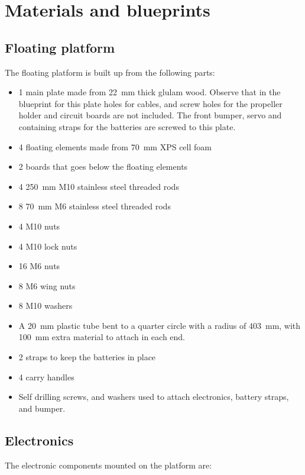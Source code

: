 \section{Materials and blueprints}

\subsection{Floating platform}

The floating platform is built up from the following parts:

\begin{itemize}
  \item 1 main plate made from 22~mm thick glulam wood. Observe that in the
    blueprint for this plate holes for cables, and screw holes for the
    propeller holder and circuit boards are not included. The front bumper,
    servo and containing straps for the batteries are screwed to this plate.
  \item 4 floating elements made from 70~mm XPS cell foam
  \item 2 boards that goes below the floating elements
  \item 4 250~mm M10 stainless steel threaded rods
  \item 8 70~mm M6 stainless steel threaded rods
  \item 4 M10 nuts
  \item 4 M10 lock nuts
  \item 16 M6 nuts
  \item 8 M6 wing nuts
  \item 8 M10 washers
  \item A 20~mm plastic tube bent to a quarter circle with a radius of 403~mm,
    with 100~mm extra material to attach in each end.
  \item 2 straps to keep the batteries in place
  \item 4 carry handles
  \item Self drilling screws, and washers used to attach electronics, battery
    straps, and bumper.
\end{itemize}

\subsection{Electronics}


The electronic components mounted on the platform are:

